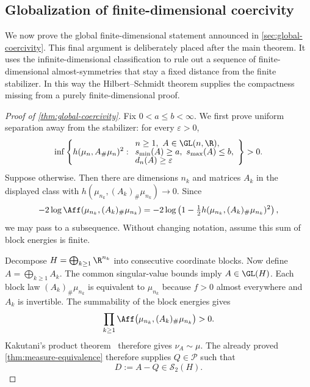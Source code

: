 \subsection{Globalization of finite-dimensional coercivity}
\label{sec:globalization-proof}

We now prove the global finite-dimensional statement announced in
\cref{sec:global-coercivity}.
This final argument is deliberately placed after the main theorem.
It uses the infinite-dimensional classification to rule out a sequence of
finite-dimensional almost-symmetries that stay a fixed distance from the
finite stabilizer.
In this way the Hilbert--Schmidt theorem supplies the compactness missing
from a purely finite-dimensional proof.

\begin{proof}[Proof of \cref{thm:global-coercivity}]
Fix \(0<a\le b<\infty\).  We first prove uniform separation away from
the stabilizer: for every \(\varepsilon>0\),
\begin{equation}
 \inf\left\{
 h(\mu_n,A_\#\mu_n)^2:
 \begin{array}{l}
 n\ge1,\ A\in\GL(n,\R),\\[-2pt]
 s_{\min}(A)\ge a,\ s_{\max}(A)\le b,\\[-2pt]
 d_n(A)\ge\varepsilon
 \end{array}\right\}>0.
 \label{eq:uniform-separation}
\end{equation}
Suppose otherwise.
Then there are dimensions \(n_k\) and matrices \(A_k\) in the displayed class
with
\(h(\mu_{n_k},(A_k)_\#\mu_{n_k})\to0\).  Since
\[
 -2\log\Aff(\mu_{n_k},(A_k)_\#\mu_{n_k})
 =-2\log\left(1-\tfrac12
 h(\mu_{n_k},(A_k)_\#\mu_{n_k})^2\right),
 \]
we may pass to a subsequence.
Without changing notation, assume this sum of block energies is finite.

Decompose \(H=\bigoplus_{k\ge1}\R^{n_k}\) into consecutive
coordinate blocks.
Now define
\(A=\bigoplus_{k\ge1}A_k\).  The common singular-value bounds imply
\(A\in\GL(H)\).  Each block law $(A_k)_\#\mu_{n_k}$ is
equivalent to $\mu_{n_k}$ because $f>0$ almost everywhere and $A_k$ is
invertible.  The summability of the block energies gives
\[
 \prod_{k\ge1}\Aff\bigl(\mu_{n_k},(A_k)_\#\mu_{n_k}\bigr)>0.
\]
Kakutani's product theorem~\cite{kakutani1948equivalence} therefore
gives \(\nu_A\sim\mu\).  The already proved
\cref{thm:measure-equivalence} therefore supplies \(Q\in\mathcal P\) such that
\begin{equation}
 D:=A-Q\in\mathcal S_2(H).
 \label{eq:globalization-D}
\end{equation}


\end{proof}
